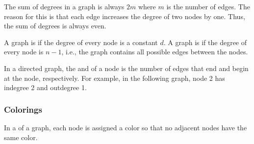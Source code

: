 The sum of degrees in a graph is always $2m$
where $m$ is the number of edges.
The reason for this is that each edge
increases the degree of two nodes by one.
Thus, the sum of degrees is always even.


A graph is  if the
degree of every node is a constant $d$.
A graph is  if the
degree of every node is $n-1$, i.e.,
the graph contains all possible edges
between the nodes.


In a directed graph, the 
and  of a node is
the number of edges that end and begin
at the node, respectively.
For example, in the following graph,
node 2 has indegree 2 and outdegree 1.

\begin{center}
\end{center}

\subsubsection{Colorings}


In a  of a graph,
each node is assigned a color so that
no adjacent nodes have the same color.

